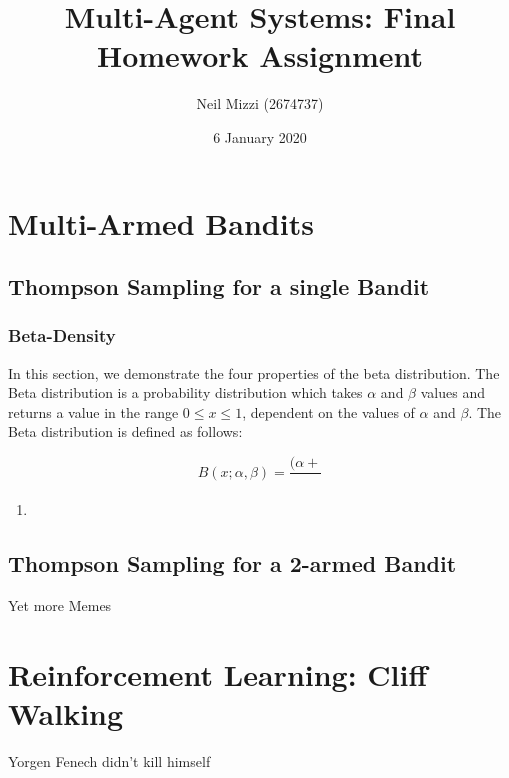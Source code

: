 \documentclass{article}
\title{Multi-Agent Systems: Final Homework Assignment}
\author{Neil Mizzi (2674737)}
\date{6 January 2020}
\begin{document}
\maketitle

\section{Multi-Armed Bandits}
\subsection{Thompson Sampling for a single Bandit}
\subsubsection{Beta-Density}
In this section, we demonstrate the four properties of the beta distribution. The Beta distribution is a probability distribution which takes $\alpha$ and $\beta$ values and returns a value in the range $0 \leq x \leq 1$, dependent on the values of $\alpha$ and $\beta$. The Beta distribution is defined as follows:

\begin{equation}
    B(x; \alpha, \beta) = 
    \frac{(\alpha + }{}
\end{equation}

\begin{enumerate}
    \item 
\end{enumerate}

\subsection{Thompson Sampling for a 2-armed Bandit}
Yet more Memes
\section{Reinforcement Learning: Cliff Walking}
Yorgen Fenech didn't kill himself
\end{document}
